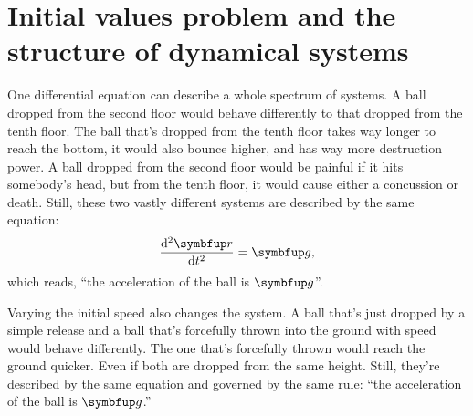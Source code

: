 \section{Initial values problem and the structure of dynamical systems}

One differential equation can describe a whole spectrum of systems. A ball dropped from the second floor would behave differently to that dropped from the tenth floor. The ball that's dropped from the tenth floor takes way longer to reach the bottom, it would also bounce higher, and has way more destruction power. A ball dropped from the second floor would be painful if it hits somebody's head, but from the tenth floor, it would cause either a concussion or death. Still, these two vastly different systems are described by the same equation:
\begin{equation}
  \odv[ord = 2]{\vv{r}}{t} = \vv{g},
\end{equation}
which reads, \enquote{the acceleration of the ball is \(\vv{g}\)}.

Varying the initial speed also changes the system. A ball that's just dropped by a simple release and a ball that's forcefully thrown into the ground with speed would behave differently. The one that's forcefully thrown would reach the ground quicker. Even if both are dropped from the same height. Still, they're described by the same equation and governed by the same rule: \enquote{the acceleration of the ball is \(\vv{g}\).}

